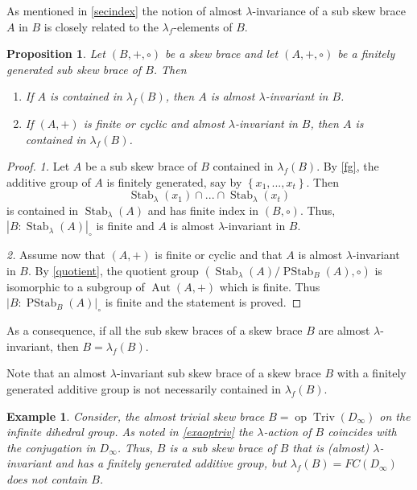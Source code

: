 \documentclass{amsart}
\newcommand{\Aut}{\operatorname{Aut}}
\newcommand{\Stab}{\operatorname{Stab}}
\newcommand{\Triv}{\operatorname{Triv}}
\newcommand{\op}{\operatorname{op}}
\newcommand{\PStab}{\operatorname{PStab}}
\newtheorem{pro}[thm]{Proposition}
\newtheorem{exa}[thm]{Example}
\begin{document}
As mentioned in \cref{secindex} the notion of almost $\lambda$-invariance of a sub skew brace $A$ in $B$ is closely related to the $\lambda_f$-elements of $B$. 
\begin{pro}
    Let $(B,+,\circ)$ be a skew brace and let $(A,+,\circ)$ be a finitely generated sub skew brace of $B$. Then
    \begin{enumerate}
        \item If $A$ is contained in $\lambda_f(B)$, then $A$ is almost $\lambda$-invariant in $B$.
        \item If $(A,+)$ is finite or cyclic and almost $\lambda$-invariant in $B$, then $A$ is contained in $\lambda_f(B)$.
    \end{enumerate}
\end{pro}
\begin{proof}
    \textit{1.} Let $A$ be a sub skew brace of $B$ contained in $\lambda_f(B)$. By \cref{fg}, the additive group of $A$ is finitely generated, say by $\left\lbrace x_1,..., x_t \right\rbrace$. Then $$\Stab_\lambda(x_1)\cap...\cap \Stab_\lambda(x_t)$$ is contained in $\Stab_\lambda(A)$ and has finite index in $(B,\circ)$. Thus, $|B:\Stab_\lambda(A)|_{\circ}$ is finite and $A$ is almost $\lambda$-invariant in $B$.

    \medskip
    
    \textit{2.} Assume now that $(A,+)$ is finite or cyclic and that $A$ is almost $\lambda$-invariant in $B$. By \cref{quotient}, the quotient group $(\Stab_\lambda(A)/\PStab_B(A),\circ)$ is isomorphic to a subgroup of $\Aut(A,+)$ which is finite. Thus $|B:\PStab_B(A)|_{\circ}$ is finite and the statement is proved.
    
\end{proof}

As a consequence, if all the sub skew braces of a skew  brace $B$ are almost $\lambda$-invariant, then $B=\lambda_f(B)$.


    Note that an almost $\lambda$-invariant sub skew brace of a skew brace $B$ with a finitely generated additive group is not necessarily contained in $\lambda_f(B)$.
\begin{exa}
    Consider, the almost trivial skew brace $B=\op\Triv(D_\infty)$
    on the infinite dihedral group.
    As noted in \cref{exaoptriv} the $\lambda$-action of $B$ coincides with the conjugation in $D_\infty$. Thus, $B$ is a sub skew brace of $B$ that is (almost) $\lambda$-invariant and has a finitely generated additive group, but $\lambda_f(B)=FC(D_\infty)$ does not contain $B$.
\end{exa}
   
\end{document}
